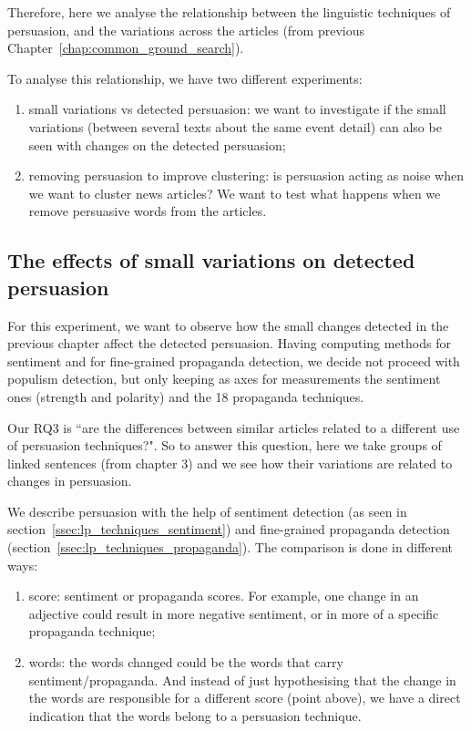 Therefore, here we analyse the relationship between the linguistic techniques of persuasion, and the variations across the articles (from previous Chapter~\ref{chap:common_ground_search}).

To analyse this relationship, we have two different experiments:

\begin{enumerate}
    \item small variations vs detected persuasion: we want to investigate if the small variations (between several texts about the same event detail) can also be seen with changes on the detected persuasion; 
    \item removing persuasion to improve clustering: is persuasion acting as noise when we want to cluster news articles? We want to test what happens when we remove persuasive words from the articles.
\end{enumerate}

\subsection{\statusorange The effects of small variations on detected persuasion}
\label{ssec:lp_relationship_small_variations}

For this experiment, we want to observe how the small changes detected in the previous chapter affect the detected persuasion.
Having computing methods for sentiment and for fine-grained propaganda detection, we decide not proceed with populism detection, but only keeping as axes for measurements the sentiment ones (strength and polarity) and the 18 propaganda techniques.

Our RQ3 is ``are the differences between similar articles related to a different use of persuasion techniques?".
So to answer this question, here we take groups of linked sentences (from chapter 3) and we see how their variations are related to changes in persuasion.

We describe persuasion with the help of sentiment detection (as seen in section~\ref{ssec:lp_techniques_sentiment}) and fine-grained propaganda detection (section~\ref{ssec:lp_techniques_propaganda}).
The comparison is done in different ways:
\begin{enumerate}
    \item score: sentiment or propaganda scores. For example, one change in an adjective could result in more negative sentiment, or in more of a specific propaganda technique;
    \item words: the words changed could be the words that carry sentiment/propaganda. And instead of just hypothesising that the change in the words are responsible for a different score (point above), we have a direct indication that the words belong to a persuasion technique.
\end{enumerate}

